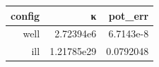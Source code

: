 \begin{tabular}{rrr}
  \toprule
  \textbf{config} & \textbf{κ} & \textbf{pot\_err} \\
  \midrule
  well & 2.72394e6 & 6.7143e-8 \\
  ill & 1.21785e29 & 0.0792048 \\
  \bottomrule
\end{tabular}
